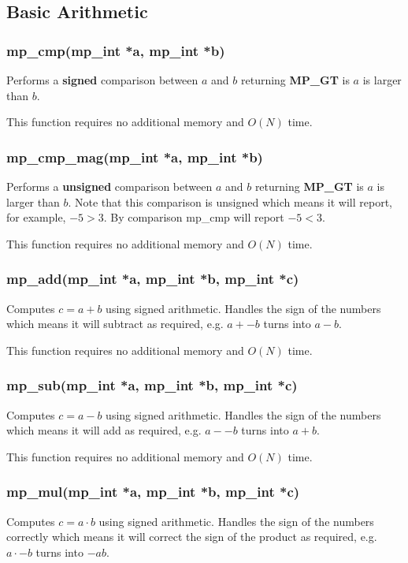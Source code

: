 \documentclass{article}
\begin{document}
\subsection{Basic Arithmetic}

\subsubsection{mp\_cmp(mp\_int *a, mp\_int *b)}
Performs a \textbf{signed} comparison between $a$ and $b$ returning \textbf{MP\_GT} is $a$ is larger than $b$.

This function requires no additional memory and $O(N)$ time.

\subsubsection{mp\_cmp\_mag(mp\_int *a, mp\_int *b)}
Performs a \textbf{unsigned} comparison between $a$ and $b$ returning \textbf{MP\_GT} is $a$ is larger than $b$.  Note 
that this comparison is unsigned which means it will report, for example, $-5 > 3$.  By comparison mp\_cmp will 
report $-5 < 3$.

This function requires no additional memory and $O(N)$ time.

\subsubsection{mp\_add(mp\_int *a, mp\_int *b, mp\_int *c)}
Computes $c = a + b$ using signed arithmetic.  Handles the sign of the numbers which means it will subtract as 
required, e.g. $a + -b$ turns into $a - b$.

This function requires no additional memory and $O(N)$ time.

\subsubsection{mp\_sub(mp\_int *a, mp\_int *b, mp\_int *c)}
Computes $c = a - b$ using signed arithmetic.   Handles the sign of the numbers which means it will add as 
required, e.g. $a - -b$ turns into $a + b$.

This function requires no additional memory and $O(N)$ time.

\subsubsection{mp\_mul(mp\_int *a, mp\_int *b, mp\_int *c)}
Computes $c = a \cdot b$ using signed arithmetic.  Handles the sign of the numbers correctly which means it will 
correct the sign of the product as required, e.g. $a \cdot -b$ turns into $-ab$.
\end{document}
